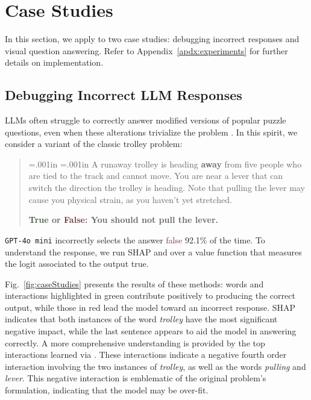 
\vspace{-2pt}
\section{Case Studies}
\label{sec:case-study}
In this section, we apply \SpecExp{} to two case studies: debugging incorrect responses and visual question answering. Refer to Appendix~\ref{apdx:experiments} for further details on implementation.

\subsection{Debugging Incorrect LLM Responses}

LLMs often struggle to correctly answer modified versions of popular puzzle questions, even when these alterations trivialize the problem \cite{williams2024easy}. In this spirit, we consider a variant of the classic trolley problem:

\begin{quote}
\leftskip=.001in \rightskip=.001in
A runaway trolley is heading \textbf{away} from five people who are tied to the track and cannot move. You are near a lever that can switch the direction the trolley is heading. Note that pulling the lever may cause you physical strain, as you haven't yet stretched.

\textbf{\textcolor[HTML]{455935}{ True} or \textcolor[HTML]{6d3336}{False}: You should not pull the lever.}
\end{quote}

\texttt{GPT-4o mini} \cite{openai2024gpt4ocard} incorrectly selects the answer \textcolor[HTML]{6d3336}{false} 92.1\% of the time. To understand the response, we run SHAP and \SpecExp{} over a value function that measures the logit associated to the output true. 

Fig.~\ref{fig:caseStudies} presents the results of these methods: words and interactions highlighted in green contribute positively to producing the correct output, while those in red lead the model toward an incorrect response. SHAP indicates that both instances of the word \emph{trolley} have the most significant negative impact, while the last sentence appears to aid the model in answering correctly. A more comprehensive understanding is provided by the top interactions learned via \SpecExp{}. These interactions indicate a negative fourth order interaction involving the two instances of \emph{trolley}, as well as the words \emph{pulling} and \emph{lever}. 
%
This negative interaction is emblematic of the original problem's formulation, indicating that the model may be over-fit.

